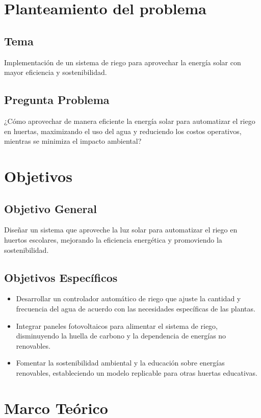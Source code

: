 \documentclass[12pt]{article}
\begin{document}
\section{Planteamiento del problema}
\subsection{Tema}
Implementación de un sistema de riego para aprovechar la energía solar con mayor eficiencia y sostenibilidad.

\subsection{Pregunta Problema}
¿Cómo aprovechar de manera eficiente la energía solar para automatizar el riego en huertas, maximizando el uso del agua y reduciendo los costos operativos, mientras se minimiza el impacto ambiental?
\newpage
\section{Objetivos}
\subsection{Objetivo General}
Diseñar un sistema que aproveche la luz solar para automatizar el riego en huertos escolares, mejorando la eficiencia energética y promoviendo la sostenibilidad.


\subsection{Objetivos Específicos}
\begin{itemize}
      \item Desarrollar un controlador automático de riego que ajuste la cantidad y frecuencia del agua de acuerdo con las necesidades específicas de las plantas.
      \item Integrar paneles fotovoltaicos para alimentar el sistema de riego, disminuyendo la huella de carbono y la dependencia de energías no renovables.
      \item Fomentar la sostenibilidad ambiental y la educación sobre energías renovables, estableciendo un modelo replicable para otras huertas educativas.
\end{itemize}
\newpage
\section{Marco Teórico}
\end{document}
